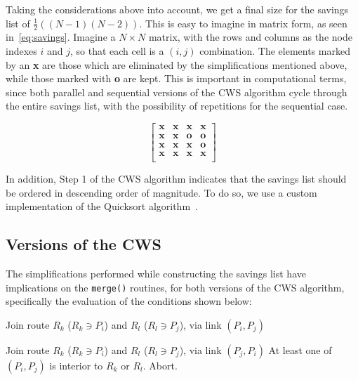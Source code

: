 Taking the considerations above into account, we get a final size for the 
savings list of $\frac{1}{2}((N - 1)(N - 2))$. This is easy to imagine in 
matrix form, as seen in~\ref{eq:savings}. Imagine a $N \times N$ matrix, with 
the rows and columns as the node indexes $i$ and $j$, so that each cell is a 
$(i,j)$ combination. The elements marked by an \textbf{x} are those which are 
eliminated by the simplifications mentioned above, while those marked with 
\textbf{o} are kept. This is important in computational terms, since both 
parallel and sequential versions of the CWS algorithm cycle through the entire 
savings list, with the possibility of repetitions for the sequential 
case.\vertbreak

\begin{equation}
\begin{bmatrix} \textbf{x} & \textbf{x} & \textbf{x} & \textbf{x} \\ 
                \textbf{x} & \textbf{x} & \textbf{o} & \textbf{o} \\ 
                \textbf{x} & \textbf{x} & \textbf{x} & \textbf{o} \\ 
                \textbf{x} & \textbf{x} & \textbf{x} & \textbf{x} \\ \end{bmatrix}
    \label{eq:savings}
\end{equation}\vertbreak

In addition, Step 1 of the CWS algorithm indicates that the savings list should 
be ordered in descending order of magnitude. To do so, we use a custom 
implementation of the Quicksort 
algorithm~\cite{Hoare:1961:AP:366622.366642}.

\subsection{Versions of the CWS}
\label{subsec:cws-p}

The simplifications performed while 
constructing the savings list have implications on the \verb?merge()? routines, 
for both versions of the CWS algorithm, specifically the evaluation of the 
conditions shown below:\vertbreak

\begin{algorithmic}[1]

    \State Join route $R_k$ ($R_k \ni P_i$) and $R_l$ ($R_l \ni P_j$), via 
    \Statex[2] link $(P_i,P_j)$
    

    \State Join route $R_k$ ($R_k \ni P_i$) and $R_l$ ($R_l \ni P_j$), via 
    \Statex[2] link $(P_j,P_i)$
\Else 
    \State At least one of $(P_i,P_j)$ is interior to $R_k$ or $R_l$.
    \Statex[2] Abort.
\EndIf
\end{algorithmic}\vertbreak

